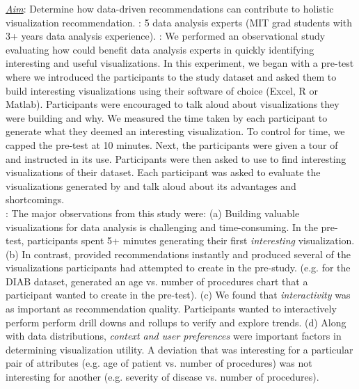{\it \underline{Aim}}: Determine how data-driven 
recommendations can contribute to holistic visualization recommendation.
: 5 data analysis experts (MIT grad students with 3+ years data analysis experience).
: We performed an observational study evaluating how \SeeDB could benefit data analysis experts in quickly identifying interesting and useful visualizations.
In this experiment, we began with a pre-test where we introduced the participants to the study dataset and asked them to build interesting visualizations using their software of choice (Excel, R or Matlab).
Participants were encouraged to talk aloud about visualizations they were building and why.
We measured the time taken by each participant to generate what they deemed an interesting visualization.
To control for time, we capped the pre-test at 10 minutes.
Next, the participants were given a tour of \SeeDB and instructed in its use.
Participants were then asked to use \SeeDB to find interesting visualizations of their dataset.
Each participant was asked to evaluate the visualizations generated by \SeeDB and talk aloud about its advantages and shortcomings.\\
:
The major observations from this study were:
 (a) Building valuable visualizations for data analysis is challenging and time-consuming. In the pre-test, participants spent 5+ minutes generating their first {\it interesting} visualization.
(b) In contrast, \SeeDB provided recommendations instantly and produced several of the visualizations participants had attempted to create in the pre-study.  
(e.g. for the DIAB dataset, \SeeDB generated an age vs. number of procedures chart that a participant wanted to create in the pre-test).
(c) We found that {\it interactivity} was as important as recommendation quality. Participants wanted to interactively perform perform drill downs and rollups to verify and explore trends.
 (d) Along with data distributions, {\it context and user preferences}  were  important factors in determining visualization utility. A deviation that was interesting for a particular pair of attributes (e.g. age of patient vs. number of procedures) was not interesting for another (e.g. severity of disease vs. number of procedures). 

